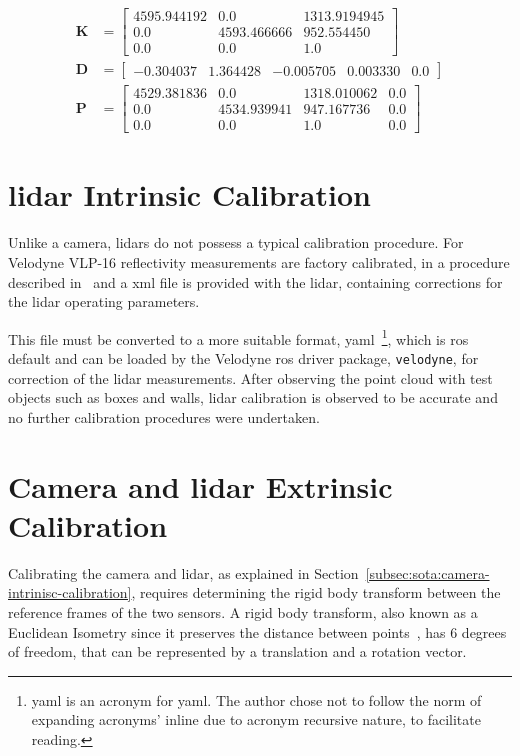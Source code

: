 \begin{subequations}
	\label{eq:camera-calibration-results}
	\begin{align}
		\mathbf{K} & = 
		\begin{bmatrix}
			4595.944192 & 0.0         &  1313.9194945 \\
			0.0         & 4593.466666 &  952.554450 \\
			0.0         & 0.0         &  1.0
		\end{bmatrix} \nonumber \\
		\mathbf{D} & = 
		\begin{bmatrix}
			-0.304037 & 1.364428 &  -0.005705 & 0.003330 & 0.0
		\end{bmatrix} \nonumber \\
		\mathbf{P} & = 
		\begin{bmatrix}
			4529.381836 & 0.0         & 1318.010062 & 0.0 \\
			0.0         & 4534.939941 & 947.167736  & 0.0 \\
			0.0         & 0.0         & 1.0         & 0.0 
		\end{bmatrix}
		\nonumber
	\end{align}
\end{subequations}

	

\section{\acs{lidar} Intrinsic Calibration}
\label{sec:calibration:lidar}
Unlike a camera, \acp{lidar} do not possess a typical calibration procedure. For Velodyne VLP-16 reflectivity measurements are factory calibrated, in a procedure described in~\cite{vlp16} and a \ac{xml} file is provided with the \ac{lidar}, containing corrections for the \ac{lidar} operating parameters.

This file must be converted to a more suitable format, \acs{yaml}~\footnote{\acs{yaml} is an acronym for \acl{yaml}. The author chose not to follow the norm of expanding acronyms' inline due to acronym recursive nature, to facilitate reading.}, which is \ac{ros} default and can be loaded by the Velodyne \ac{ros} driver package, \texttt{velodyne}, for correction of the \ac{lidar} measurements. After observing the point cloud with test objects such as boxes and walls, \ac{lidar} calibration is observed to be accurate and no further calibration procedures were undertaken.

\section{Camera and \ac{lidar} Extrinsic Calibration}
\label{sec:calibration:extrinsic}
Calibrating the camera and \ac{lidar}, as explained in Section~\ref{subsec:sota:camera-intrinisc-calibration}, requires determining the rigid body transform between the reference frames of the two sensors. A rigid body transform, also known as a Euclidean Isometry since it preserves the distance between points~\cite{mvg_book}, has 6 degrees of freedom, that can be represented by a translation and a rotation vector.

